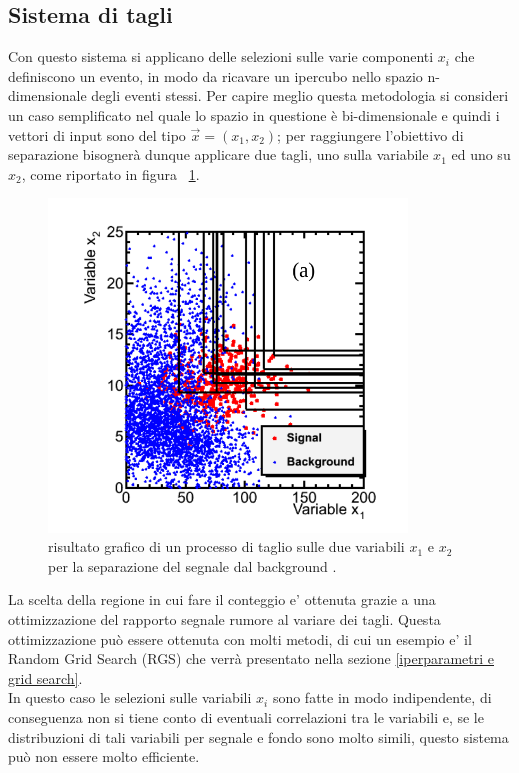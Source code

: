 \subsection{Sistema di tagli}
\label{sistema di tagli}
Con questo sistema si applicano delle selezioni sulle varie componenti $x_i$ che definiscono un evento, in modo da ricavare un ipercubo nello spazio n-dimensionale degli eventi stessi. Per capire meglio questa metodologia si consideri un caso semplificato nel quale lo spazio in questione è bi-dimensionale e quindi i vettori di input sono del tipo $\vec{x} = (x_1,x_2)$; per raggiungere l'obiettivo di separazione bisognerà dunque applicare due tagli, uno sulla variabile $x_1$ ed uno su $x_2$, come riportato in figura ~\ref{fig:grid_example}.

\begin{figure}[h!]
	\centering
	\includegraphics[width=0.85\textwidth]{figs/Grid_example.png}
	\caption{risultato grafico di un processo di taglio sulle due variabili $x_1$ e $x_2$ per la separazione del segnale dal background \cite{Metodi_multivariati}.}
	\label{fig:grid_example}
\end{figure}

La scelta della regione in cui fare il conteggio e' ottenuta grazie a una ottimizzazione del rapporto segnale rumore al variare dei tagli. Questa ottimizzazione può essere ottenuta con molti metodi, di cui un esempio e' il Random Grid Search (RGS) che verrà presentato nella sezione \ref{iperparametri e grid search}. \\
In questo caso le selezioni sulle variabili $x_i$ sono fatte in modo indipendente, di conseguenza non si tiene conto di eventuali correlazioni tra le variabili e, se le distribuzioni di tali variabili per segnale e fondo sono molto simili, questo sistema può non essere molto efficiente.

